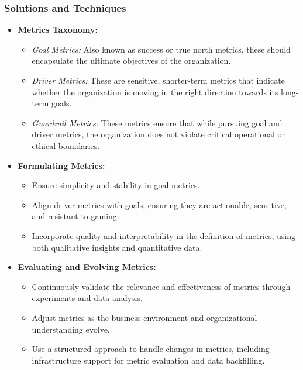 \documentclass{article}
\begin{document}
\subsubsection*{Solutions and Techniques}
\begin{itemize}
    \item \textbf{Metrics Taxonomy:}
    \begin{itemize}
        \item \textit{Goal Metrics:} Also known as success or true north metrics, these should encapsulate the ultimate objectives of the organization.
        \item \textit{Driver Metrics:} These are sensitive, shorter-term metrics that indicate whether the organization is moving in the right direction towards its long-term goals.
        \item \textit{Guardrail Metrics:} These metrics ensure that while pursuing goal and driver metrics, the organization does not violate critical operational or ethical boundaries.
    \end{itemize}

    \item \textbf{Formulating Metrics:}
    \begin{itemize}
        \item Ensure simplicity and stability in goal metrics.
        \item Align driver metrics with goals, ensuring they are actionable, sensitive, and resistant to gaming.
        \item Incorporate quality and interpretability in the definition of metrics, using both qualitative insights and quantitative data.
    \end{itemize}

    \item \textbf{Evaluating and Evolving Metrics:}
    \begin{itemize}
        \item Continuously validate the relevance and effectiveness of metrics through experiments and data analysis.
        \item Adjust metrics as the business environment and organizational understanding evolve.
        \item Use a structured approach to handle changes in metrics, including infrastructure support for metric evaluation and data backfilling.
    \end{itemize}
\end{itemize}
\end{document}
